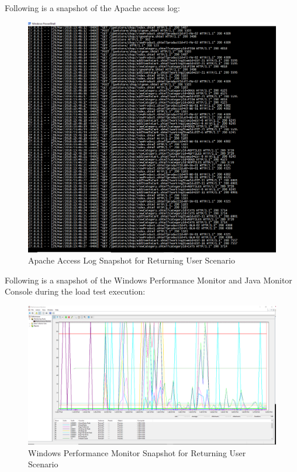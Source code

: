 \documentclass[fontsize=12pt,paper=letter,twoside]{scrartcl}
\begin{document}
\bigskip
\noindent Following is a snapshot of the Apache access log:
\begin{figure}[!htb]
\begin{center}
\includegraphics[width=.7\textwidth]{../../load-test/test-plans/returning-user/access-log.png}
\end{center}
\caption{Apache Access Log Snapshot for Returning User Scenario}
\label{fig:ruser:access_log}
\end{figure}

\clearpage
\bigskip
\noindent Following is a snapshot of the Windows Performance Monitor and Java Monitor Console during the load test execution:

\begin{figure}[!htb]
\begin{center}
\includegraphics[width=.7\textwidth]{../../load-test/test-plans/returning-user/perfmon-ru.png}
\end{center}
\caption{Windows Performance Monitor Snapshot for Returning User Scenario}
\label{fig:ruser:perfmon}
\end{figure}
\end{document}

